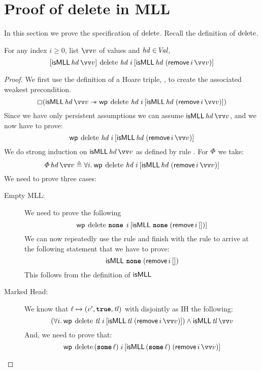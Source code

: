 \documentclass[thesis.tex]{subfiles}
\begin{document}
\section{Proof of delete in MLL}
\label{sec:proofmll}
In this section we prove the specification of $\operatorname{delete}$. Recall the definition of $\operatorname{delete}$.
\MLLDeleteProg
\\
\begin{lemma}
  For any index $i \ge 0$, list $\vect{\val}$ of values and $\mathit{hd}\in\kern-0.2em\textit{Val}$,
  \[
    \hoare{\isMLL\, \langv{hd}\, \vect{\val}}{\MLLdelete\, \langv{hd}\; \iindex }{\isMLL\, \langv{hd}\; (\textlog{remove}\, \iindex\, \vect{v})}
  \]
\end{lemma}
\begin{proof}
  We first use the definition of a Hoare triple, , to create the associated weakest precondition.
  \[\always(\isMLL\, \langv{hd}\, \vect{\val} \wand \wpre{\MLLdelete\, \langv{hd}\; \iindex}{\isMLL\, \langv{hd}\; (\textlog{remove}\, \iindex\, \vect{v})})\]
  Since we have only persistent assumptions we can assume
  $\isMLL\, \langv{hd}\, \vect{\val}$, and we now have to prove:
  \[\wpre{\MLLdelete\, \langv{hd}\; \iindex}{\isMLL\, \langv{hd}\; (\textlog{remove}\, \iindex\, \vect{v})}\]
  We do strong induction on $\isMLL\, \langv{hd}\, \vect{\val}$ as defined by rule . For $\varPhi$ we take:
  \[
    \pred\, \langv{hd}\, \vect{\val} \eqdef \All \iindex. \wpre{\MLLdelete\, \langv{hd}\; \iindex}{\isMLL\, \langv{hd}\; (\textlog{remove}\, \iindex\, \vect{v})}
  \]
  We need to prove three cases:
  \begin{description}
    \item[Empty MLL:] We need to prove the following
      \[\wpre{\MLLdelete\, \None\; \iindex}{\isMLL\, \None\; (\textlog{remove}\, \iindex\, [])}\]
      We can now repeatedly use the  rule and finish with the rule  to arrive at the following statement that we have to prove:
      \[\textsf{\upshape isMLL}\, \operatorname{\texttt{\bfseries none}}\; (\textsf{\upshape remove}\, i\, [])\]
      This follows from the definition of $\textsf{\upshape isMLL}$
    \item[Marked Head:] We know that $\loc \fmapsto (\val', \True, \langv{tl})$ with disjointly as IH the following:
      \[\left(\All \iindex. \wpre{\MLLdelete\, \langv{tl}\; \iindex}{\isMLL\, \langv{tl}\; (\textlog{remove}\, \iindex\, \vect{\val})}\right) \land \isMLL\, \langv{tl}\, \vect{\val}\]
      And, we need to prove that:
      \[\wpre{\MLLdelete\, (\Some \loc)\; \iindex}{\isMLL\, (\Some \loc)\; (\textlog{remove}\, \iindex\, \vect{v})}\]

\end{description}
\end{proof}
\end{document}

